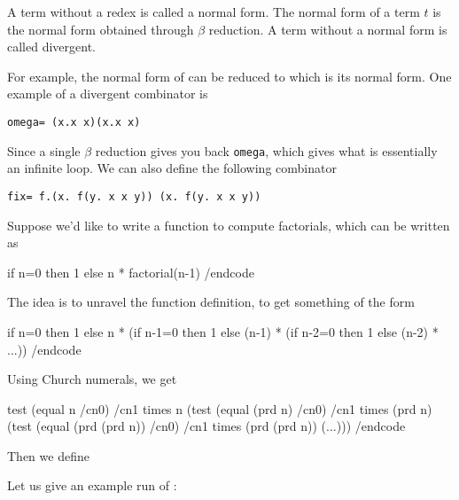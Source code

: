 \smallskip
{}

\bdefn

    A term without a redex is called a {\emphcolor normal form}.
    The normal form of a term $t$ is the normal form obtained through $\beta$ reduction.
    A term without a normal form is called {\emphcolor divergent}.

\edefn

For example, the normal form of  can be reduced to  which is its normal form.
One example of a divergent combinator is

\smallskip
\centerline{\tt omega= (\lambda x.x x)(\lambda x.x x)}

Since a single $\beta$ reduction gives you back {\tt omega}, which gives what is essentially an infinite loop.
We can also define the following combinator

\smallskip
\centerline{\tt fix= \lambda f.(\lambda x. f(\lambda y. x x y)) (\lambda x. f(\lambda y. x x y))}

Suppose we'd like to write a function to compute factorials, which can be written as

\begincode
if n=0 then 1
else n * factorial(n-1)
/endcode

The idea is to unravel the function definition, to get something of the form

\begincode
if n=0 then 1
else n * (if n-1=0 then 1
          else (n-1) * (if n-2=0 then 1
                        else (n-2) * ...))
/endcode

Using Church numerals, we get

\begincode
test (equal n /cn0) 
    /cn1
    times n (test (equal (prd n) /cn0)
            /cn1
            times (prd n) (test (equal (prd (prd n)) /cn0)
                           /cn1
                           times (prd (prd n)) (...)))
/endcode

Then we define


Let us give an example run of :

\medskip
{}

